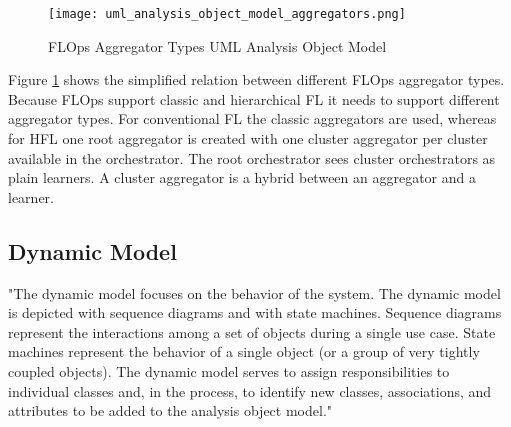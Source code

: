 \begin{figure}[h]
    \centering
    \texttt{[image: uml\_analysis\_object\_model\_aggregators.png]}
    \caption{FLOps Aggregator Types UML Analysis Object Model}
    \label{fig:uml_project_aggregators_analysis_object_model}
\end{figure}

Figure \ref{fig:uml_project_aggregators_analysis_object_model} shows the simplified relation between different FLOps aggregator types.
Because FLOps support classic and hierarchical FL it needs to support different aggregator types.
For conventional FL the classic aggregators are used, whereas for HFL one root aggregator is created with one cluster aggregator per cluster available in the orchestrator.
The root orchestrator sees cluster orchestrators as plain learners.
A cluster aggregator is a hybrid between an aggregator and a learner.








\subsection{Dynamic Model}
"The dynamic model focuses on the behavior of the system. The dynamic model is
depicted with sequence diagrams and with state machines. Sequence diagrams represent the
interactions among a set of objects during a single use case. State machines represent the
behavior of a single object (or a group of very tightly coupled objects). The dynamic model
serves to assign responsibilities to individual classes and, in the process, to identify new classes,
associations, and attributes to be added to the analysis object model."